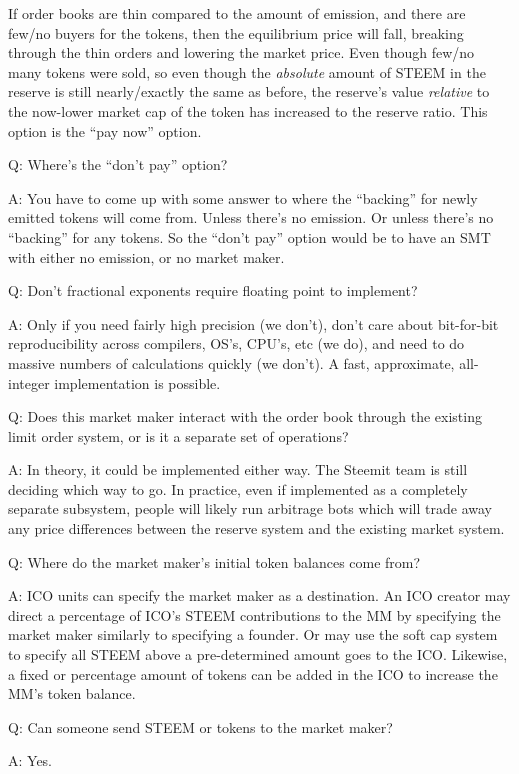 \documentclass{article}
\begin{document}
If order books are thin compared to the amount of emission, and there are few/no buyers for the
tokens, then the equilibrium price will fall, breaking through the thin orders and lowering
the market price.  Even though few/no many tokens were sold, so even though the
\textit{absolute} amount of STEEM in the reserve is still nearly/exactly the same as before,
the reserve's value \textit{relative} to the now-lower market cap of the token has increased
to the reserve ratio.  This option is the ``pay now'' option.

Q:  Where's the ``don't pay'' option?

A:  You have to come up with some answer to where the ``backing'' for newly emitted
tokens will come from.  Unless there's no emission.  Or unless there's no ``backing'' for
any tokens.  So the ``don't pay'' option would be to have an SMT with either no
emission, or no market maker.

Q:  Don't fractional exponents require floating point to implement?

A:  Only if you need fairly high precision (we don't), don't care about bit-for-bit
reproducibility across compilers, OS's, CPU's, etc (we do), and need to do massive
numbers of calculations quickly (we don't).  A fast, approximate, all-integer
implementation is possible.

Q:  Does this market maker interact with the order book through the existing limit order
system, or is it a separate set of operations?

A:  In theory, it could be implemented either way.  The Steemit team is still deciding
which way to go.  In practice, even if implemented as a completely separate subsystem,
people will likely run arbitrage bots which will trade away any price differences
between the reserve system and the existing market system.

Q:  Where do the market maker's initial token balances come from?

A:  ICO units can specify the market maker as a destination.  An ICO creator
may direct a percentage of ICO's STEEM contributions to the MM by specifying
the market maker similarly to specifying a founder.  Or may use the soft cap
system to specify all STEEM above a pre-determined amount goes to the ICO.  Likewise,
a fixed or percentage amount of tokens can be added in the ICO to increase the MM's
token balance.

Q:  Can someone send STEEM or tokens to the market maker?

A:  Yes.
\end{document}
